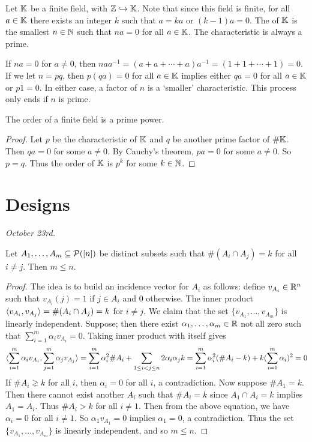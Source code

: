 Let $\mathbb{K}$ be a finite field, with $\mathbb{Z} \hookrightarrow \mathbb{K}$. Note that since this field is finite, for all $a \in \mathbb{K}$ there exists an integer $k$ such that $a = ka$ or $(k-1)a = 0$. The  of $\mathbb{K}$ is the smallest $n \in \mathbb{N}$ such that $na = 0$ for all $a \in \mathbb{K}$. The characteristic is always a prime.

If $na = 0$ for $a \neq 0$, then $na a^{-1} = (a + a + \cdots + a) a^{-1} = (1 + 1 + \cdots + 1) = 0$. If we let $n = pq$, then $p(qa) = 0$ for all $a \in \mathbb{K}$ implies either $qa = 0$ for all $a \in \mathbb{K}$ or $p 1 = 0$. In either case, a factor of $n$ is a `smaller' characteristic. This process only ends if $n$ is prime.

\begin{proposition}
    The order of a finite field is a prime power.
\end{proposition}
\begin{proof}
    Let $p$ be the characteristic of $\mathbb{K}$ and $q$ be another prime factor of $\# \mathbb{K}$. Then $qa = 0$ for some $a \neq 0$. By Cauchy's theorem, $pa = 0$ for some $a \neq 0$. So $p = q$. Thus the order of $\mathbb{K}$ is $p^{k}$ for some $k \in \mathbb{N}$.
\end{proof}

\section{Designs}
\textit{October 23rd.}

\begin{theorem}
    Let $A_{1},\ldots,A_{m} \subseteq \mathcal{P}([n])$ be distinct subsets such that $\#(A_{i} \cap A_{j}) = k$ for all $i \neq j$. Then $m \leq n$.
\end{theorem}

\begin{proof}
    The idea is to build an incidence vector for $A_{i}$ as follows: define $v_{A_{i}} \in \mathbb{R}^{n}$ such that $v_{A_{i}}(j) = 1$ if $j \in A_{i}$ and $0$ otherwise. The inner product $\langle v_{A_{i}},v_{A_{j}}\rangle = \#(A_{i} \cap A_{j}) = k$ for $i \neq j$. We claim that the set $\{v_{A_{1}},\ldots,v_{A_{m}}\}$ is linearly independent. Suppose; then there exist $\alpha_{1},\ldots,\alpha_{m} \in \mathbb{R}$ not all zero such that $\sum_{i=1}^{m} \alpha_{i} v_{A_{i}} = 0$. Taking inner product with itself gives
    \begin{align}
        \langle\sum_{i=1}^{m} \alpha_{i} v_{A_{i}},\sum_{j=1}^{m} \alpha_{j} v_{A_{j}}\rangle = \sum_{i=1}^{m} \alpha_{i}^{2} \# A_{i} + \sum_{1 \leq i < j \leq n} 2 \alpha_{i} \alpha_{j} k = \sum_{i=1}^{m} \alpha_{i}^{2} (\# A_{i} - k) + k(\sum_{i=1}^{m} \alpha_{i})^{2} = 0
    \end{align}
    If $\# A_{i} \gneq k$ for all $i$, then $\alpha_{i} = 0$ for all $i$, a contradiction. Now suppose $\# A_{1} = k$. Then there cannot exist another $A_{i}$ such that $\# A_{i} = k$ since $A_{1} \cap A_{i} = k$ implies $A_{1} = A_{i}$. Thus $\# A_{i} > k$ for all $i \neq 1$. Then from the above equation, we have $\alpha_{i} = 0$ for all $i \neq 1$. So $\alpha_{1} v_{A_{1}} = 0$ implies $\alpha_{1} = 0$, a contradiction. Thus the set $\{v_{A_{1}},\ldots,v_{A_{m}}\}$ is linearly independent, and so $m \leq n$.
\end{proof}

